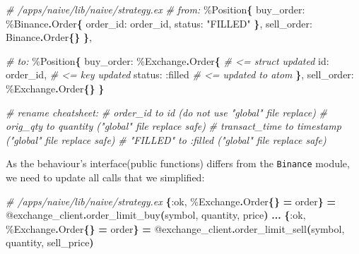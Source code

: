 \documentclass[
  oneside]{book}
\newenvironment{Shaded}{\begin{snugshade}}{\end{snugshade}}
\newcommand{\CommentTok}[1]{\textcolor[rgb]{0.56,0.35,0.01}{\textit{#1}}}
\newcommand{\ConstantTok}[1]{\textcolor[rgb]{0.56,0.35,0.01}{#1}}
\newcommand{\FunctionTok}[1]{\textcolor[rgb]{0.13,0.29,0.53}{\textbf{#1}}}
\newcommand{\NormalTok}[1]{#1}
\newcommand{\OperatorTok}[1]{\textcolor[rgb]{0.81,0.36,0.00}{\textbf{#1}}}
\newcommand{\OtherTok}[1]{\textcolor[rgb]{0.56,0.35,0.01}{#1}}
\newcommand{\StringTok}[1]{\textcolor[rgb]{0.31,0.60,0.02}{#1}}
\newcommand{\VariableTok}[1]{\textcolor[rgb]{0.00,0.00,0.00}{#1}}
\begin{document}
\begin{Shaded}
\begin{Highlighting}[]
  \CommentTok{\# /apps/naive/lib/naive/strategy.ex}
  \CommentTok{\# from:}
\NormalTok{        \%}\ConstantTok{Position}\FunctionTok{\{}
          \VariableTok{buy\_order:}\NormalTok{ \%}\ConstantTok{Binance}\OperatorTok{.}\ConstantTok{Order}\FunctionTok{\{}
            \VariableTok{order\_id:}\NormalTok{ order\_id,}
            \VariableTok{status:} \StringTok{"FILLED"}
          \FunctionTok{\}}\NormalTok{,}
          \VariableTok{sell\_order:} \ConstantTok{Binance}\OperatorTok{.}\ConstantTok{Order}\FunctionTok{\{\}}
        \FunctionTok{\}}\NormalTok{,}

  \CommentTok{\# to:}
\NormalTok{        \%}\ConstantTok{Position}\FunctionTok{\{}
          \VariableTok{buy\_order:}\NormalTok{ \%}\ConstantTok{Exchange}\OperatorTok{.}\ConstantTok{Order}\FunctionTok{\{} \CommentTok{\# \textless{}= struct updated}
            \VariableTok{id:}\NormalTok{ order\_id,   }\CommentTok{\# \textless{}= key updated}
            \VariableTok{status:} \VariableTok{:filled} \CommentTok{\# \textless{}= updated to atom}
          \FunctionTok{\}}\NormalTok{,}
          \VariableTok{sell\_order:}\NormalTok{ \%}\ConstantTok{Exchange}\OperatorTok{.}\ConstantTok{Order}\FunctionTok{\{\}}
        \FunctionTok{\}}

  \CommentTok{\# rename cheatsheet:}
  \CommentTok{\# order\_id to id (do not use "global" file replace)}
  \CommentTok{\# orig\_qty to quantity ("global" file replace safe)}
  \CommentTok{\# transact\_time to timestamp ("global" file replace safe)}
  \CommentTok{\# "FILLED" to :filled ("global" file replace safe)}
\end{Highlighting}
\end{Shaded}

\newpage

As the behaviour's interface(public functions) differs from the \texttt{Binance} module, we need to update all calls that we simplified:

\begin{Shaded}
\begin{Highlighting}[]
  \CommentTok{\# /apps/naive/lib/naive/strategy.ex}
  \FunctionTok{\{}\VariableTok{:ok}\NormalTok{, \%}\ConstantTok{Exchange}\OperatorTok{.}\ConstantTok{Order}\FunctionTok{\{\}} \OperatorTok{=}\NormalTok{ order}\FunctionTok{\}} \OperatorTok{=} \OtherTok{@exchange\_client}\OperatorTok{.}\NormalTok{order\_limit\_buy}\FunctionTok{(}\NormalTok{symbol, quantity, price}\FunctionTok{)}
  \OperatorTok{...}
  \FunctionTok{\{}\VariableTok{:ok}\NormalTok{, \%}\ConstantTok{Exchange}\OperatorTok{.}\ConstantTok{Order}\FunctionTok{\{\}} \OperatorTok{=}\NormalTok{ order}\FunctionTok{\}} \OperatorTok{=}
      \OtherTok{@exchange\_client}\OperatorTok{.}\NormalTok{order\_limit\_sell}\FunctionTok{(}\NormalTok{symbol, quantity, sell\_price}\FunctionTok{)}
\end{Highlighting}
\end{Shaded}
\end{document}
